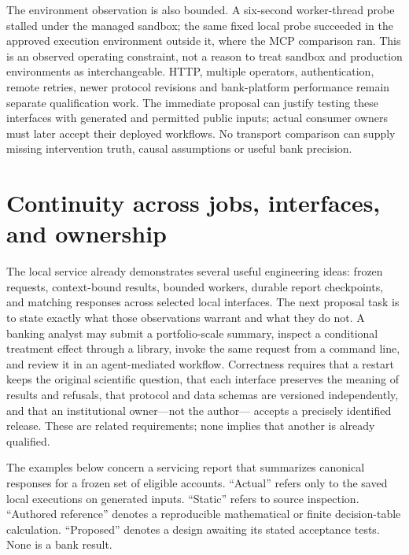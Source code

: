 The environment observation is also bounded. A six-second worker-thread probe
stalled under the managed sandbox; the same fixed local probe succeeded in
the approved execution environment outside it, where the MCP comparison ran.
This is an observed operating constraint, not a reason to treat sandbox and
production environments as interchangeable. HTTP, multiple operators,
authentication, remote retries, newer protocol revisions and bank-platform
performance remain separate qualification work. The immediate proposal can
justify testing these interfaces with generated and permitted public inputs;
actual consumer owners must later accept their deployed workflows. No transport
comparison can supply missing intervention truth, causal assumptions or useful
bank precision. \citep{exec16_parity_observed,exec16_parity_design}
\label{exec16:semantic-parity-end}


\section{Continuity across jobs, interfaces, and ownership}
\label{exec17:integration-continuity}

The local service already demonstrates several useful engineering ideas:
frozen requests, context-bound results, bounded workers, durable report
checkpoints, and matching responses across selected local interfaces. The next
proposal task is to state exactly what those observations warrant and what they
do not. A banking analyst may submit a portfolio-scale summary, inspect a
conditional treatment effect through a library, invoke the same request from a
command line, and review it in an agent-mediated workflow. Correctness requires
that a restart keeps the original scientific question, that each interface
preserves the meaning of results and refusals, that protocol and data schemas
are versioned independently, and that an institutional owner—not the author—
accepts a precisely identified release. These are related requirements; none
implies that another is already qualified.

The examples below concern a servicing report that summarizes canonical
responses for a frozen set of eligible accounts. “Actual” refers only to the
saved local executions on generated inputs. “Static” refers to source
inspection. “Authored reference” denotes a reproducible mathematical or finite
decision-table calculation. “Proposed” denotes a design awaiting its stated
acceptance tests. None is a bank result.~\citep{exec16_parity_observed,exec14_failure_observations}

